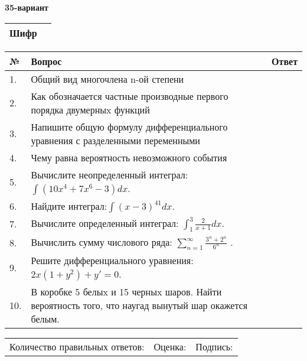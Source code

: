 \documentclass{article}
\begin{document}
  \egroup
  
  \newpage
  
  
  \textbf{35-вариант}\\
  
  \bgroup
  \def\arraystretch{1.6} %
  
  \begin{tabular}{|m{5.7cm}|m{9.5cm}|}
  \hline
  Шифр & \\
  \hline
  \end{tabular}
  
  \vspace{1cm}
  
  \begin{tabular}{|m{0.7cm}|m{10cm}|m{4cm}|}
  \hline
  № & Вопрос & Ответ \\
  \hline
  1. & Общий вид многочлена n-ой степени &  \\
  \hline
  2. & Как обозначается частные производные первого порядка двумерныx функций &  \\
  \hline
  3. & Напишите общую формулу дифференциального уравнения с разделенными переменными &  \\
  \hline
  4. & Чему равна вероятность невозможного события &  \\
  \hline
  5. & Вычислите неопределенный интеграл: \(\int{\left( 10x^{4} + 7x^{6} - 3 \right)dx}\). &  \\
  \hline
  6. & Найдите интеграл:\(\int{(x - 3)^{41}}dx\). &  \\
  \hline
  7. & Вычислите определенный интеграл: \(\int_{1}^{3}{\frac{2}{x + 1}dx}\). &  \\
  \hline
  8. & Вычислить сумму числового ряда: \(\sum_{n = 1}^{\infty}\frac{3^{n} + 2^{n}}{6^{n}}\) . &  \\
  \hline
  9. & Решите дифференциального уравнения: \(2x\left( 1 + y^{2} \right) + y' = 0\). &  \\
  \hline
  10. & В коробке 5 белыx и 15 черныx шаров. Найти вероятность того, что наугад вынутый шар окажется белым. &  \\
  \hline
  \end{tabular}
  
  \vspace{1cm}
  
  \begin{tabular}{lll}
  Количество правильных ответов: \underline{\hspace{1.5cm}} & 
  Оценка: \underline{\hspace{1.5cm}} & 
  Подпись: \underline{\hspace{2cm}} \\
  \end{tabular}
  
\end{document}
